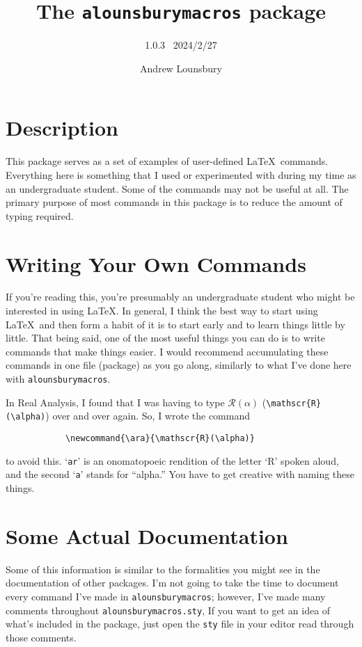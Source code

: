 \documentclass[12pt]{article}
\begin{document}
    \title{The \texttt{alounsburymacros} package}
    \author{1.0.3 \ 2024/2/27}
    \date{Andrew Lounsbury}
    \maketitle

    \section{Description}
    This package serves as a set of examples of user-defined \LaTeX\ commands. Everything here is something that I used or experimented with during my time as an undergraduate student. Some of the commands may not be useful at all. The primary purpose of most commands in this package is to reduce the amount of typing required. 

    \section{Writing Your Own Commands}
    If you're reading this, you're presumably an undergraduate student who might be interested in using \LaTeX. In general, I think the best way to start using \LaTeX\ and then form a habit of it is to start early and to learn things little by little. \p
    That being said, one of the most useful things you can do is to write commands that make things easier. I would recommend accumulating these commands in one file (package) as you go along, similarly to what I've done here with \texttt{alounsburymacros}. 
    \begin{example*}
        In Real Analysis, I found that I was having to type $\mathscr{R}(\alpha)$ (\texttt{\textbackslash mathscr\{R\}(\textbackslash alpha)}) over and over again. So, I wrote the command 
        \begin{verbatim}
            \newcommand{\ara}{\mathscr{R}(\alpha)}
        \end{verbatim}
        to avoid this. `\texttt{ar}' is an onomatopoeic rendition of the letter `R' spoken aloud, and the second `\texttt{a}' stands for ``alpha.'' You have to get creative with naming these things. 
    \end{example*}
    
    \section{Some Actual Documentation}
    Some of this information is similar to the formalities you might see in the documentation of other packages. \p
    I'm not going to take the time to document every command I've made in \texttt{alounsburymacros}; however, I've made many comments throughout \texttt{alounsburymacros.sty}, If you want to get an idea of what's included in the package, just open the \texttt{sty} file in your editor read through those comments. 
\end{document}
